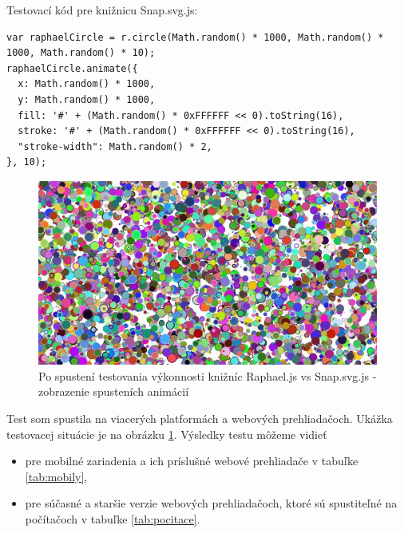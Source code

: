 Testovací kód pre knižnicu Snap.svg.js:
\begin{lstlisting}
var raphaelCircle = r.circle(Math.random() * 1000, Math.random() * 1000, Math.random() * 10);
raphaelCircle.animate({
  x: Math.random() * 1000,
  y: Math.random() * 1000,
  fill: '#' + (Math.random() * 0xFFFFFF << 0).toString(16),
  stroke: '#' + (Math.random() * 0xFFFFFF << 0).toString(16),
  "stroke-width": Math.random() * 2,
}, 10);
\end{lstlisting}


 \begin{figure}[H]
\centering
\includegraphics[width=0.7\linewidth]{obrazky/testovanieSnapVsRaphael.jpg}
\caption{Po spustení testovania výkonnosti knižníc Raphael.js vs Snap.svg.js - zobrazenie spusteních animácií}
\label{fig:podpora2}
\end{figure}



Test som spustila na viacerých platformách a webových prehliadačoch.   Ukážka testovacej situácie je na obrázku \ref{fig:podpora2}.
Výsledky testu môžeme vidieť 
\begin{itemize}
	\item pre mobilné zariadenia a ich príslušné webové prehliadače v tabuľke \ref{tab:mobily},
	\item  pre súčasné a staršie verzie webových prehliadačoch, ktoré sú spustiteľné na počítačoch  v tabuľke \ref{tab:pocitace}.
\end{itemize}






